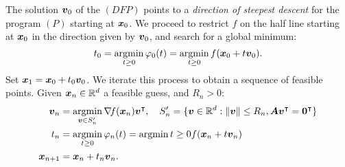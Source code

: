 The solution $\boldsymbol{v}_0$ of the $(DFP)$ points to a \emph{direction of steepest descent} for the program $(P)$ starting at $\boldsymbol{x}_0$.  We proceed to restrict $f$ on the half line starting at $\boldsymbol{x}_0$ in the direction given by $\boldsymbol{v}_0$, and search for a global minimum:
\begin{equation*}
t_0 = \operatorname*{argmin}_{t \geq 0} \varphi_0(t) = \operatorname*{argmin}_{t \geq 0} f(\boldsymbol{x}_0 + t\boldsymbol{v}_0).
\end{equation*}
Set $\boldsymbol{x}_1 = \boldsymbol{x}_0 + t_0\boldsymbol{v}_0$.  We iterate this process to obtain a sequence of feasible points.  Given $\boldsymbol{x}_n \in \mathbb{R}^d$ a feasible guess, and $R_n > 0$:
\begin{align*}
\boldsymbol{v}_n &= \operatorname*{argmin}_{\boldsymbol{v} \in S_n'} \mathop{\nabla\! {f}}(\boldsymbol{x}_n){\boldsymbol{v}}^\intercal, \quad S_n' = \{ \boldsymbol{v} \in \mathbb{R}^d : \lVert \boldsymbol{v} \rVert \leq R_n, \boldsymbol{A}{\boldsymbol{v}}^\intercal={\boldsymbol{0}}^\intercal\} \\
t_n &= \operatorname*{argmin}_{t \geq 0} \varphi_n(t) = \operatorname*{argmin}{t \geq 0} f(\boldsymbol{x}_n + t \boldsymbol{v}_n) \\
\boldsymbol{x}_{n+1} &= \boldsymbol{x}_n + t_n \boldsymbol{v}_n.
\end{align*}

